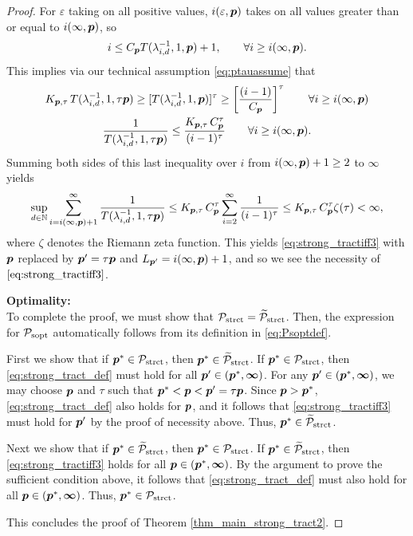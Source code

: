 \documentclass[11pt,a4paper]{article}
\newcommand{\vinfty}{\boldsymbol{\infty}}
\begin{document}
\begin{proof}
For $\varepsilon$ taking on all positive values, $i(\varepsilon,\boldsymbol{p})$ takes on all values greater than or equal to $i(\infty,\boldsymbol{p})$, so
\[
i\le C_{\boldsymbol{p}} T(\lambda_{i,d}^{-1},1,\boldsymbol{p})+1, \qquad \forall i \ge i(\infty,\boldsymbol{p}).
\]
This implies via our technical assumption \eqref{eq:ptauassume} that
\begin{gather*}
 K_{\boldsymbol{p},\tau}\,T (\lambda_{i,d}^{-1},1,\tau \boldsymbol{p}) \ge
 [T(\lambda_{i,d}^{-1},1, \boldsymbol{p})]^\tau
 \ge
  \left[\frac{(i-1)}{C_{\boldsymbol{p}}}\right]^\tau \qquad \forall i \ge i(\infty,\boldsymbol{p}) \\
 \frac{1}{T (\lambda_{i,d}^{-1},1,\tau \boldsymbol{p})} \le
\frac{K_{\boldsymbol{p},\tau}\, C_{\boldsymbol{p}}^\tau}{(i-1)^\tau}\qquad \forall i \ge i(\infty,\boldsymbol{p}).
\end{gather*}
Summing both sides of this last inequality over $i$ from $i(\infty,\boldsymbol{p}) +1 \ge 2$ to $\vinfty$ yields
\begin{equation*}
\sup_{d\in\mathbb{N}} \sum_{i=i(\infty,\boldsymbol{p}) +1 }^\infty \frac{1}{T (\lambda_{i,d}^{-1},1, \tau \boldsymbol{p})}
 \le  K_{\boldsymbol{p},\tau}\, C_{\boldsymbol{p}}^\tau
\sum_{i=2}^\infty \frac{1}{(i-1)^\tau} \\
 \le K_{\boldsymbol{p},\tau}\, C_{\boldsymbol{p}}^\tau
\zeta (\tau)  < \infty,
\end{equation*}
where $\zeta$ denotes the Riemann zeta function.
This yields \eqref{eq:strong_tractiff3} with $\boldsymbol{p}$ replaced by $\boldsymbol{p}' = \tau \boldsymbol{p}$ and $L_{\boldsymbol{p}'} = i(\infty,\boldsymbol{p}) +1$, and so we see the necessity of $\eqref{eq:strong_tractiff3}$.

\bigskip
\noindent \textbf{Optimality:} \\
To complete the proof, we must show that $\mathcal{P}_{\textup{strct}} = \widetilde{\mathcal{P}}_{\textup{strct}}$.  Then, the expression for  $\mathcal{P}_{\textup{sopt}}$ automatically follows from its definition in \eqref{eq:Psoptdef}.

First we show  that if $\boldsymbol{p}^* \in \mathcal{P}_{\textup{strct}}$, then $\boldsymbol{p}^* \in \widetilde{\mathcal{P}}_{\textup{strct}}$.  If $\boldsymbol{p}^* \in \mathcal{P}_{\textup{strct}}$, then \eqref{eq:strong_tract_def} must hold for all $\vp' \in (\vp^*,\vinfty)$.  For any $\vp' \in (\vp^*,\vinfty)$, we may choose $\boldsymbol{p}$ and $\tau$ such that $\boldsymbol{p}^* < \boldsymbol{p} < \boldsymbol{p}' = \tau \boldsymbol{p}$. Since $\boldsymbol{p} > \boldsymbol{p}^*$, \eqref{eq:strong_tract_def} also holds for $\boldsymbol{p}$, and it follows that \eqref{eq:strong_tractiff3} must hold for $\boldsymbol{p}'$ by the proof of necessity above.  Thus, $\boldsymbol{p}^* \in \widetilde{\mathcal{P}}_{\textup{strct}}$.

Next we show that if $\boldsymbol{p}^* \in \widetilde{\mathcal{P}}_{\textup{strct}}$, then $\boldsymbol{p}^* \in \mathcal{P}_{\textup{strct}}$.  If $\boldsymbol{p}^* \in \widetilde{\mathcal{P}}_{\textup{strct}}$, then \eqref{eq:strong_tractiff3}  holds for all $\vp \in (\vp^*,\vinfty)$.  By the argument to prove the sufficient condition above, it follows that \eqref{eq:strong_tract_def} must also hold for all $\vp \in (\vp^*,\vinfty)$. Thus, $\boldsymbol{p}^* \in \mathcal{P}_{\textup{strct}}$.

\bigskip

\noindent This concludes the proof of  Theorem \ref{thm_main_strong_tract2}.

\end{proof}
\end{document}
